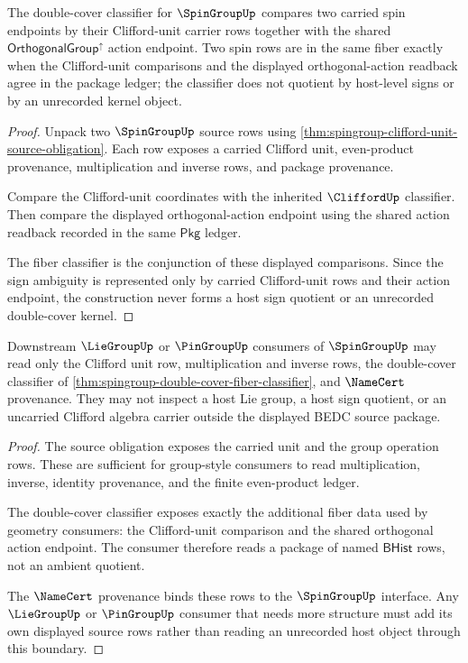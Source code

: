 \begin{theorem}
\label{thm:spingroup-double-cover-fiber-classifier}
The double-cover classifier for $\SpinGroupUp$ compares two carried spin
endpoints by their Clifford-unit carrier rows together with the shared
$\mathsf{OrthogonalGroup}^{\uparrow}$ action endpoint. Two spin rows are in the same fiber
exactly when the Clifford-unit comparisons and the displayed orthogonal-action
readback agree in the package ledger; the classifier does not quotient by
host-level signs or by an unrecorded kernel object.
\end{theorem}
\begin{proof}
Unpack two $\SpinGroupUp$ source rows using
\autoref{thm:spingroup-clifford-unit-source-obligation}. Each row exposes a
carried Clifford unit, even-product provenance, multiplication and inverse
rows, and package provenance.

Compare the Clifford-unit coordinates with the inherited $\CliffordUp$
classifier. Then compare the displayed orthogonal-action endpoint using the
shared action readback recorded in the same $\mathsf{Pkg}$ ledger.

The fiber classifier is the conjunction of these displayed comparisons. Since
the sign ambiguity is represented only by carried Clifford-unit rows and their
action endpoint, the construction never forms a host sign quotient or an
unrecorded double-cover kernel.
\end{proof}

\begin{theorem}
\label{thm:spingroup-group-consumer-boundary}
Downstream $\LieGroupUp$ or $\PinGroupUp$ consumers of $\SpinGroupUp$ may read
only the Clifford unit row, multiplication and inverse rows, the double-cover
classifier of \autoref{thm:spingroup-double-cover-fiber-classifier}, and
$\NameCert$ provenance. They may not inspect a host Lie group, a host sign
quotient, or an uncarried Clifford algebra carrier outside the displayed BEDC
source package.
\end{theorem}
\begin{proof}
The source obligation exposes the carried unit and the group operation rows.
These are sufficient for group-style consumers to read multiplication,
inverse, identity provenance, and the finite even-product ledger.

The double-cover classifier exposes exactly the additional fiber data used by
geometry consumers: the Clifford-unit comparison and the shared orthogonal
action endpoint. The consumer therefore reads a package of named
$\mathsf{BHist}$ rows, not an ambient quotient.

The $\NameCert$ provenance binds these rows to the $\SpinGroupUp$ interface.
Any $\LieGroupUp$ or $\PinGroupUp$ consumer that needs more structure must add
its own displayed source rows rather than reading an unrecorded host object
through this boundary.
\end{proof}

